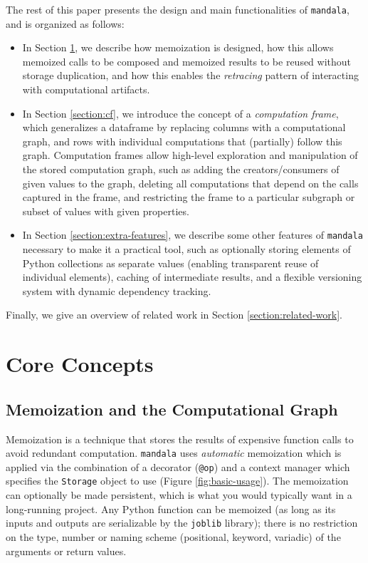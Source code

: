 \documentclass{article} %
\begin{document}
The rest of this paper presents the design and main functionalities of
\texttt{mandala}, and is organized as follows: 
\begin{itemize}
\item In Section \ref{section:core-concepts}, we describe how memoization is
designed, how this allows memoized calls to be composed and memoized results to
be reused without storage duplication, and how this enables the \emph{retracing}
pattern of interacting with computational artifacts.
\item In Section \ref{section:cf}, we introduce the concept of a
\emph{computation frame}, which generalizes a dataframe by replacing columns
with a computational graph, and rows with individual computations that
(partially) follow this graph. Computation frames allow high-level exploration
and manipulation of the stored computation graph, such as adding the
creators/consumers of given values to the graph, deleting all computations that
depend on the calls captured in the frame, and restricting the frame to a
particular subgraph or subset of values with given properties.
\item In Section \ref{section:extra-features}, we describe some other features of
\texttt{mandala} necessary to make it a practical tool, such as optionally
storing elements of Python collections as separate values (enabling transparent
reuse of individual elements), caching of intermediate results, and a flexible
versioning system with dynamic dependency tracking.
\end{itemize}

Finally, we give an overview of related work in Section \ref{section:related-work}.

\section{Core Concepts}
\label{section:core-concepts}

\subsection{Memoization and the Computational Graph}

Memoization is a technique that stores the results of expensive function calls
to avoid redundant computation. \texttt{mandala} uses \emph{automatic}
memoization \citep{norvig1991techniques} which is applied via the combination of
a decorator (\texttt{@op}) and a context manager which specifies the
\texttt{Storage} object to use (Figure \ref{fig:basic-usage}). The memoization
can optionally be made persistent, which is what you would typically want in a
long-running project. Any Python function can be memoized (as long as its inputs
and outputs are serializable by the \texttt{joblib} library); there is no
restriction on the type, number or naming scheme (positional, keyword, variadic)
of the arguments or return values.
\end{document}
